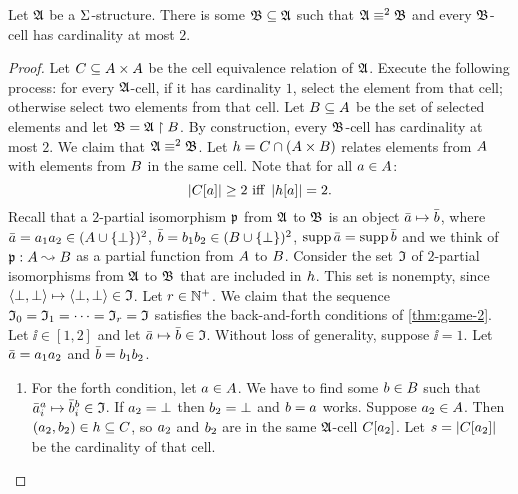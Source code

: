 \begin{lemma}\label{lem:twovar-cell-2}
Let $\mathfrak{A}$ be a $\mathrm{\Sigma}$-structure.
There is some $\mathfrak{B} \subseteq \mathfrak{A}$ such that
$\mathfrak{A} \equiv^{2} \mathfrak{B}$ and every
$\mathfrak{B}$-cell has cardinality at most $2$.
\end{lemma}
\begin{proof}
Let $C \subseteq {A\times A}$ be the cell equivalence relation of $\mathfrak{A}$.
Execute the following process: for every $\mathfrak{A}$-cell, if it has cardinality
$1$, select the element from that cell; otherwise select two elements from that
cell.
Let $B \subseteq A$ be the set of selected elements and let
$\mathfrak{B} = \mathfrak{A} \restriction B$.
By construction, every $\mathfrak{B}$-cell has cardinality at most $2$.
We claim that $\mathfrak{A} \equiv^{2} \mathfrak{B}$.
Let $h = C \cap (A \times B)$ relates elements from $A$ with
elements from $B$ in the same cell.
Note that for all $a \in A$:
\begin{equation}\label{eq:twovar-cell-2}
  \miff{
  \card{\relC[\ea]} \geq 2}{
  \card{\selh[\ea]} = 2}.
\end{equation}
Recall that a $2$-partial isomorphism $\mathfrak{p}$ from $\mathfrak{A}$ to $\mathfrak{B}$ is an
object $\bar{a} \mapsto \bar{b}$, where
$\bar{a} = a_{1}a_{2} \in (A \cup \left\{\bot\right\})^2$,
$\bar{b} = b_{1}b_{2} \in (B \cup \left\{\bot\right\})^2$,
$\operatorname{supp}\bar{a} = \operatorname{supp}\bar{b}$
and we think of $\mathfrak{p}: A \leadsto B$ as a partial function from $A$
to $B$.
Consider the set $\mathfrak{I}$ of $2$-partial isomorphisms from
$\mathfrak{A}$ to $\mathfrak{B}$ that are included in $h$.
This set is nonempty, since $\left\langle \bot,\bot \right\rangle \mapsto \left\langle \bot,\bot \right\rangle \in
\mathfrak{I}$.
Let $r \in \mathbb{N}^{+}$. We claim that the sequence
$\mathfrak{I}_{0} = \mathfrak{I}_{1} = \dots = \mathfrak{I}_{r} = \mathfrak{I}$
satisfies the back-and-forth conditions of \cref{thm:game-2}.
Let $\ii \in [1,2]$ and let $\bar{a} \mapsto \bar{b} \in \mathfrak{I}$.
Without loss of generality, suppose $\ii = 1$.
Let $\bar{a} = a_{1}a_{2}$ and $\bar{b} = b_{1}b_{2}$.
\begin{enumerate}
  \item For the forth condition, let $a \in A$. 
  We have to find some $b \in B$ such that
  $\bar{a}_{i}^{a} \mapsto \bar{b}_{i}^{b} \in \mathfrak{I}$.
  If $a_{2} = \bot$ then $b_{2} = \bot$ and $b = a$ works.
  Suppose $a_{2} \in A$. Then $(a_{2},b_{2}) \in h \subseteq C$, so
  $a_{2}$ and $b_{2}$ are in the same $\mathfrak{A}$-cell $C[a_{2}]$.
  Let $s = \left|C[a_{2}]\right|$ be the cardinality of that cell.
 

\end{enumerate}
\end{proof}
